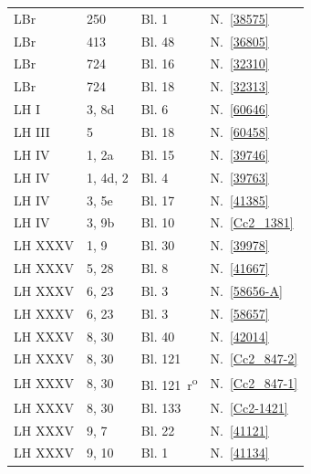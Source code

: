 \begin{longtable}{llll}

LBr & 250 & Bl. 1 & N.~\ref{38575}\\

LBr & 413 & Bl. 48 & N.~\ref{36805}\\

LBr & 724 & Bl. 16 & N.~\ref{32310}\\

LBr & 724 & Bl. 18\textendash 19 & N.~\ref{32313}\\

LH I & 3, 8d & Bl. 6 & N.~\ref{60646}\\

LH III & 5 & Bl. 18 & N.~\ref{60458}\\

LH IV & 1, 2a & Bl. 15 & N.~\ref{39746}\\

LH IV & 1, 4d, 2 & Bl. 4 & N.~\ref{39763}\\

LH IV & 3, 5e & Bl. 17 & N.~\ref{41385}\\

LH IV & 3, 9b & Bl. 10 & N.~\ref{Cc2_1381}\\

LH XXXV & 1, 9 & Bl. 30 & N.~\ref{39978}\\

LH XXXV & 5, 28 & Bl. 8\textendash 9 & N.~\ref{41667}\\

LH XXXV & 6, 23 & Bl. 3 & N.~\ref{58656-A}\\

LH XXXV & 6, 23 & Bl. 3 & N.~\ref{58657}\\

LH XXXV & 8, 30 & Bl. 40 & N.~\ref{42014}\\

LH XXXV & 8, 30 & Bl. 121 & N.~\ref{Cc2_847-2}\\

LH XXXV & 8, 30 & Bl. 121~r\textsuperscript{o}  & N.~\ref{Cc2_847-1}\\

LH XXXV & 8, 30 & Bl. 133 & N.~\ref{Cc2-1421}\\

LH XXXV & 9, 7 & Bl. 22\textendash 23 & N.~\ref{41121}\\


LH XXXV & 9, 10 & Bl. 1\textendash 2 & N.~\ref{41134}\\


\end{longtable}
